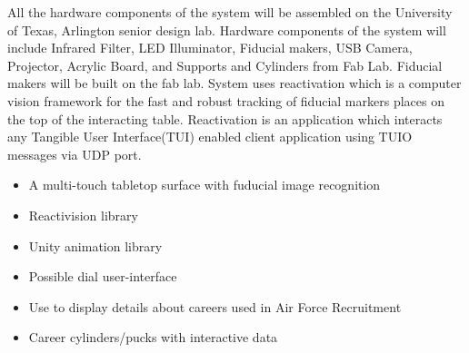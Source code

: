All the hardware components of the system will be assembled on the University of Texas, Arlington senior design lab. Hardware components of the system will include Infrared Filter, LED Illuminator, Fiducial makers, USB Camera, Projector, Acrylic Board, and Supports and Cylinders from Fab Lab. Fiducial makers will be built on the fab lab. System uses reactivation which is a computer vision framework for the fast and robust tracking of fiducial markers places on the top of the interacting table. Reactivation is an application which interacts any Tangible User Interface(TUI) enabled client application using TUIO messages via UDP port. 

\begin{itemize}
  \item A multi-touch tabletop surface with fuducial image recognition
  \item Reactivision library
  \item Unity animation library
  \item Possible dial user-interface
  \item Use to display details about careers used in Air Force Recruitment
  \item Career cylinders/pucks with interactive data
\end{itemize}
